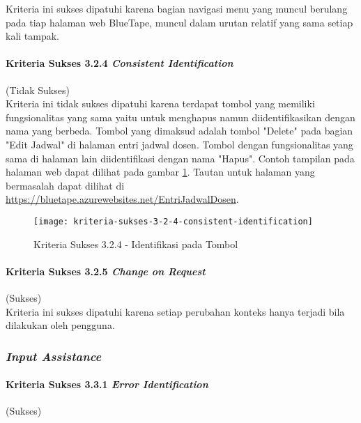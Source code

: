 Kriteria ini sukses dipatuhi karena bagian navigasi menu yang muncul berulang pada tiap halaman web BlueTape, muncul dalam urutan relatif yang sama setiap kali tampak.

\paragraph{Kriteria Sukses 3.2.4 \textit{Consistent Identification}}
\label{par:kepatuhan_bluetape_kriteria_sukses_3.2.4}
(Tidak Sukses)\\

Kriteria ini tidak sukses dipatuhi karena terdapat tombol yang memiliki fungsionalitas yang sama yaitu untuk menghapus namun diidentifikasikan dengan nama yang berbeda. Tombol yang dimaksud adalah tombol "Delete" pada bagian "Edit Jadwal" di halaman entri jadwal dosen. Tombol dengan fungsionalitas yang sama di halaman lain diidentifikasi dengan nama "Hapus". Contoh tampilan pada halaman web dapat dilihat pada gambar \ref{fig:3.2.4_consistent_identification}. Tautan untuk halaman yang bermasalah dapat dilihat di \url{https://bluetape.azurewebsites.net/EntriJadwalDosen}.

\begin{figure}[H]
    \centering  
    \texttt{[image: kriteria-sukses-3-2-4-consistent-identification]}  
    \caption[Kriteria Sukses 3.2.4 - Identifikasi pada Tombol]{Kriteria Sukses 3.2.4 - Identifikasi pada Tombol}
    \label{fig:3.2.4_consistent_identification}  
\end{figure}

\paragraph{Kriteria Sukses 3.2.5 \textit{Change on Request}}
\label{par:kepatuhan_bluetape_kriteria_sukses_3.2.5}
(Sukses)\\

Kriteria ini sukses dipatuhi karena setiap perubahan konteks hanya terjadi bila dilakukan oleh pengguna.

\subsubsection{\textit{Input Assistance}}
\label{subsubsec:kepatuhan_bluetape_input_assistance}

\paragraph{Kriteria Sukses 3.3.1 \textit{Error Identification}}
\label{par:kepatuhan_bluetape_kriteria_sukses_3.3.1}
(Sukses)\\

